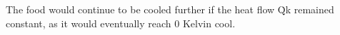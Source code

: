 The food would continue to be cooled further if the heat flow Q̇k remained constant, as it would eventually reach 0 Kelvin cool.